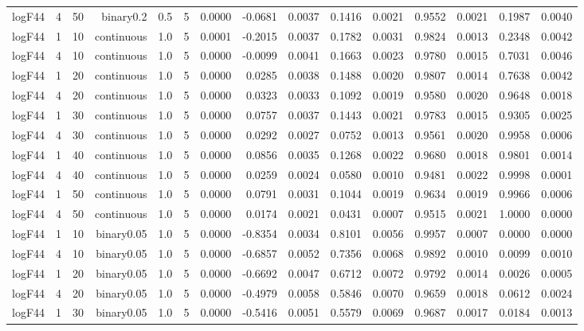\begin{longtable}{rrrrrrrrrrrrrrr}
  logF44 & 4 & 50 & binary0.2 & 0.5 & 5 & 0.0000 & -0.0681 & 0.0037 & 0.1416 & 0.0021 & 0.9552 & 0.0021 & 0.1987 & 0.0040 \\ 
  logF44 & 1 & 10 & continuous & 1.0 & 5 & 0.0001 & -0.2015 & 0.0037 & 0.1782 & 0.0031 & 0.9824 & 0.0013 & 0.2348 & 0.0042 \\ 
  logF44 & 4 & 10 & continuous & 1.0 & 5 & 0.0000 & -0.0099 & 0.0041 & 0.1663 & 0.0023 & 0.9780 & 0.0015 & 0.7031 & 0.0046 \\ 
  logF44 & 1 & 20 & continuous & 1.0 & 5 & 0.0000 & 0.0285 & 0.0038 & 0.1488 & 0.0020 & 0.9807 & 0.0014 & 0.7638 & 0.0042 \\ 
  logF44 & 4 & 20 & continuous & 1.0 & 5 & 0.0000 & 0.0323 & 0.0033 & 0.1092 & 0.0019 & 0.9580 & 0.0020 & 0.9648 & 0.0018 \\ 
  logF44 & 1 & 30 & continuous & 1.0 & 5 & 0.0000 & 0.0757 & 0.0037 & 0.1443 & 0.0021 & 0.9783 & 0.0015 & 0.9305 & 0.0025 \\ 
  logF44 & 4 & 30 & continuous & 1.0 & 5 & 0.0000 & 0.0292 & 0.0027 & 0.0752 & 0.0013 & 0.9561 & 0.0020 & 0.9958 & 0.0006 \\ 
  logF44 & 1 & 40 & continuous & 1.0 & 5 & 0.0000 & 0.0856 & 0.0035 & 0.1268 & 0.0022 & 0.9680 & 0.0018 & 0.9801 & 0.0014 \\ 
  logF44 & 4 & 40 & continuous & 1.0 & 5 & 0.0000 & 0.0259 & 0.0024 & 0.0580 & 0.0010 & 0.9481 & 0.0022 & 0.9998 & 0.0001 \\ 
  logF44 & 1 & 50 & continuous & 1.0 & 5 & 0.0000 & 0.0791 & 0.0031 & 0.1044 & 0.0019 & 0.9634 & 0.0019 & 0.9966 & 0.0006 \\ 
  logF44 & 4 & 50 & continuous & 1.0 & 5 & 0.0000 & 0.0174 & 0.0021 & 0.0431 & 0.0007 & 0.9515 & 0.0021 & 1.0000 & 0.0000 \\ 
  logF44 & 1 & 10 & binary0.05 & 1.0 & 5 & 0.0000 & -0.8354 & 0.0034 & 0.8101 & 0.0056 & 0.9957 & 0.0007 & 0.0000 & 0.0000 \\ 
  logF44 & 4 & 10 & binary0.05 & 1.0 & 5 & 0.0000 & -0.6857 & 0.0052 & 0.7356 & 0.0068 & 0.9892 & 0.0010 & 0.0099 & 0.0010 \\ 
  logF44 & 1 & 20 & binary0.05 & 1.0 & 5 & 0.0000 & -0.6692 & 0.0047 & 0.6712 & 0.0072 & 0.9792 & 0.0014 & 0.0026 & 0.0005 \\ 
  logF44 & 4 & 20 & binary0.05 & 1.0 & 5 & 0.0000 & -0.4979 & 0.0058 & 0.5846 & 0.0070 & 0.9659 & 0.0018 & 0.0612 & 0.0024 \\ 
  logF44 & 1 & 30 & binary0.05 & 1.0 & 5 & 0.0000 & -0.5416 & 0.0051 & 0.5579 & 0.0069 & 0.9687 & 0.0017 & 0.0184 & 0.0013 \\ 

\end{longtable}
